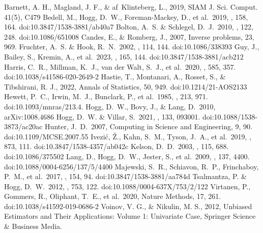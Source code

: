 \documentclass[modern, linenumbers]{aastex631}
\begin{document}
\begin{thebibliography}{dummy}
Barnett, A. H., Magland, J. F., \& af~Klinteberg, L., 2019, SIAM J. Sci. Comput. 41(5), C479
 Bedell, M., Hogg, D.~W., Foreman-Mackey, D., et al.\ 2019, \aj, 158, 164. doi:10.3847/1538-3881/ab40a7
 Bolton, A.~S. \& Schlegel, D.~J.\ 2010, \pasp, 122, 248. doi:10.1086/651008
 Candes, E., \& Romberg, J., 2007, Inverse problems, 23, 969.
 Fruchter, A.~S. \& Hook, R.~N.\ 2002, \pasp, 114, 144. doi:10.1086/338393
 Guy, J., Bailey, S., Kremin, A., et al.\ 2023, \aj, 165, 144. doi:10.3847/1538-3881/acb212
 Harris, C.~R., Millman, K.~J., van der Walt, S.~J., et al.\ 2020, \nat, 585, 357. doi:10.1038/s41586-020-2649-2
 Hastie, T., Montanari, A., Rosset, S., \& Tibshirani, R. J., 2022, Annals of Statistics, 50, 949. doi:10.1214/21-AOS2133
 Hewett, P.~C., Irwin, M.~J., Bunclark, P., et al.\ 1985, \mnras, 213, 971. doi:10.1093/mnras/213.4.
 Hogg, D.~W., Bovy, J., \& Lang, D.\ 2010, arXiv:1008.4686
 Hogg, D.~W. \& Villar, S.\ 2021, \pasp, 133, 093001. doi:10.1088/1538-3873/ac20ac
 Hunter, J.~D.\ 2007, Computing in Science and Engineering, 9, 90. doi:10.1109/MCSE.2007.55
 Ivezi{\'c}, {\v{Z}}., Kahn, S.~M., Tyson, J.~A., et al.\ 2019, \apj, 873, 111. doi:10.3847/1538-4357/ab042c
 Kelson, D.~D.\ 2003, \pasp, 115, 688. doi:10.1086/375502
 Lang, D., Hogg, D.~W., Jester, S., et al.\ 2009, \aj, 137, 4400. doi:10.1088/0004-6256/137/5/4400
 Majewski, S.~R., Schiavon, R.~P., Frinchaboy, P.~M., et al.\ 2017, \aj, 154, 94. doi:10.3847/1538-3881/aa784d
 Tsalmantza, P. \& Hogg, D.~W.\ 2012, \apj, 753, 122. doi:10.1088/0004-637X/753/2/122
 Virtanen, P., Gommers, R., Oliphant, T.~E., et al.\ 2020, Nature Methods, 17, 261. doi:10.1038/s41592-019-0686-2
 Voinov, V. G., \& Nikulin, M. S., 2012, Unbiased Estimators and Their Applications: Volume 1: Univariate Case, Springer Science \& Business Media.

\end{thebibliography}
\end{document}
